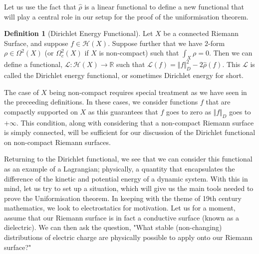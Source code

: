 \documentclass[11pt]{report}
\theoremstyle{definition}
\newtheorem{defn}[thm]{Definition}
\begin{document}
Let us use the fact that $\hat{\rho}$ is a linear functional to define a new functional that will play a central role in our setup for the proof of the uniformisation theorem.

\begin{defn}[Dirichlet Energy Functional]
  Let $X$ be a connected Riemann Surface, and suppose $f \in \mathcal{H}(X)$. Suppose further that we have $2$-form $\rho \in \Omega^2 (X)$ (or $\Omega^2_c (X)$ if $X$ is non-compact) such that $\int_X \rho = 0$. Then we can define a functional, $\mathcal{L}: 
  \mathcal{H}(X) \rightarrow \mathbb{R}$ such that $\mathcal{L}(f) = \Vert f\Vert ^2_D - 2\hat{\rho}(f)$. This $\mathcal{L}$ is called the Dirichlet energy functional, or sometimes Dirichlet energy for short.
\end{defn}

The case of $X$ being non-compact requires special treatment as we have seen in the preceeding definitions. In these cases, we consider functions $f$ that are compactly supported on $X$ as this guarantees that $f$ goes to zero as $\Vert f\Vert _D$ goes to $+\infty$. This condition, along with considering that a non-compact Riemann surface is simply connected, will be sufficient for our discussion of the Dirichlet functional on non-compact Riemann surfaces.

Returning to the Dirichlet functional, we see that we can consider this functional as an example of a Lagrangian; physically, a quantity that encapsulates the difference of the kinetic and potential energy of a dynamic system. With this in mind, let us try to set up a situation, which will give us the main tools needed to prove the Uniformisation theorem. In keeping with the theme of 19th century mathematics, we look to electrostatics for motivation. Let us for a moment, assume that our Riemann surface is in fact a conductive surface (known as a dielectric). We can then ask the question, "What stable (non-changing) distributions of electric charge are physically possible to apply onto our Riemann surface?" 
\end{document}
